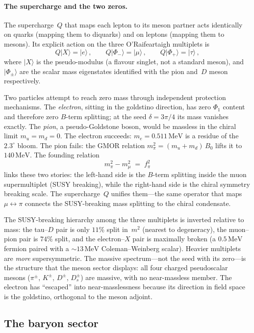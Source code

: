 \documentclass[12pt,a4paper]{article}
\newcommand{\MeV}{\,\text{MeV}}
\newcommand{\fpi}{f_\pi}
\begin{document}
\paragraph{The supercharge and the two zeros.}
The supercharge~$Q$ that maps each lepton to its meson partner
acts identically on quarks (mapping them to diquarks) and on
leptons (mapping them to mesons).  Its explicit action on the
three O'Raifeartaigh multiplets is
\[
  Q\lvert X\rangle = \lvert e\rangle\,,\qquad
  Q\lvert \Phi_-\rangle = \lvert \mu\rangle\,,\qquad
  Q\lvert \Phi_+\rangle = \lvert \tau\rangle\,,
\]
where $\lvert X\rangle$ is the pseudo-modulus (a flavour singlet,
not a standard meson), and $\lvert \Phi_\pm\rangle$ are the scalar
mass eigenstates identified with the pion and~$D$ meson respectively.

Two particles attempt to reach zero mass through independent
protection mechanisms.  The \emph{electron}, sitting in the
goldstino direction, has zero $\Phi_1$ content and therefore
zero $B$-term splitting; at the seed
$\delta = 3\pi/4$ its mass vanishes exactly.  The \emph{pion},
a pseudo-Goldstone boson, would be massless in the chiral limit
$m_u = m_d = 0$.  The electron succeeds:
$m_e = 0.511\MeV$ is a residue of the $2.3^\circ$ bloom.
The pion fails: the GMOR
relation $m_\pi^2 = (m_u{+}m_d)\,B_0$ lifts it to $140\MeV$.
The founding relation
\[
  m_\pi^2 - m_\mu^2 \;=\; \fpi^2
\]
links these two stories:
the left-hand side is the $B$-term splitting inside
the muon supermultiplet (SUSY breaking), while the right-hand
side is the chiral symmetry breaking scale.
The supercharge~$Q$ unifies them---the same operator that maps
$\mu \leftrightarrow \pi$ connects the SUSY-breaking mass
splitting to the chiral condensate.

The SUSY-breaking hierarchy among the three multiplets is
inverted relative to mass:
the tau--$D$ pair is only $11\%$ split in~$m^2$
(nearest to degeneracy),
the muon--pion pair is $74\%$ split,
and the electron--$X$ pair is maximally broken
(a $0.5\MeV$ fermion paired with a
$\sim 13\MeV$ Coleman--Weinberg scalar).
Heavier multiplets are \emph{more} supersymmetric.
The massive spectrum---not the seed with its zero---is the
structure that the meson sector displays:
all four charged pseudoscalar mesons
($\pi^\pm$, $K^\pm$, $D^\pm$, $D_s^\pm$) are massive, with
no near-massless member.  The electron has ``escaped''
into near-masslessness because its direction in field space is
the goldstino, orthogonal to the meson adjoint.

\subsection{The baryon sector}
\end{document}
